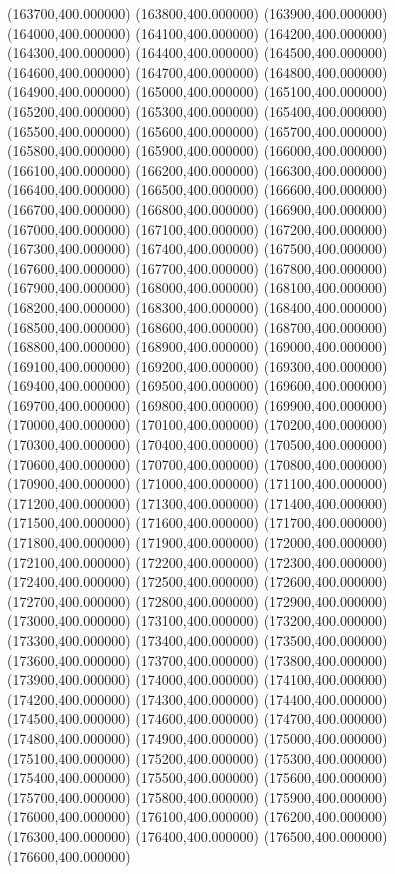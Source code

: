 (163700,400.000000)
(163800,400.000000)
(163900,400.000000)
(164000,400.000000)
(164100,400.000000)
(164200,400.000000)
(164300,400.000000)
(164400,400.000000)
(164500,400.000000)
(164600,400.000000)
(164700,400.000000)
(164800,400.000000)
(164900,400.000000)
(165000,400.000000)
(165100,400.000000)
(165200,400.000000)
(165300,400.000000)
(165400,400.000000)
(165500,400.000000)
(165600,400.000000)
(165700,400.000000)
(165800,400.000000)
(165900,400.000000)
(166000,400.000000)
(166100,400.000000)
(166200,400.000000)
(166300,400.000000)
(166400,400.000000)
(166500,400.000000)
(166600,400.000000)
(166700,400.000000)
(166800,400.000000)
(166900,400.000000)
(167000,400.000000)
(167100,400.000000)
(167200,400.000000)
(167300,400.000000)
(167400,400.000000)
(167500,400.000000)
(167600,400.000000)
(167700,400.000000)
(167800,400.000000)
(167900,400.000000)
(168000,400.000000)
(168100,400.000000)
(168200,400.000000)
(168300,400.000000)
(168400,400.000000)
(168500,400.000000)
(168600,400.000000)
(168700,400.000000)
(168800,400.000000)
(168900,400.000000)
(169000,400.000000)
(169100,400.000000)
(169200,400.000000)
(169300,400.000000)
(169400,400.000000)
(169500,400.000000)
(169600,400.000000)
(169700,400.000000)
(169800,400.000000)
(169900,400.000000)
(170000,400.000000)
(170100,400.000000)
(170200,400.000000)
(170300,400.000000)
(170400,400.000000)
(170500,400.000000)
(170600,400.000000)
(170700,400.000000)
(170800,400.000000)
(170900,400.000000)
(171000,400.000000)
(171100,400.000000)
(171200,400.000000)
(171300,400.000000)
(171400,400.000000)
(171500,400.000000)
(171600,400.000000)
(171700,400.000000)
(171800,400.000000)
(171900,400.000000)
(172000,400.000000)
(172100,400.000000)
(172200,400.000000)
(172300,400.000000)
(172400,400.000000)
(172500,400.000000)
(172600,400.000000)
(172700,400.000000)
(172800,400.000000)
(172900,400.000000)
(173000,400.000000)
(173100,400.000000)
(173200,400.000000)
(173300,400.000000)
(173400,400.000000)
(173500,400.000000)
(173600,400.000000)
(173700,400.000000)
(173800,400.000000)
(173900,400.000000)
(174000,400.000000)
(174100,400.000000)
(174200,400.000000)
(174300,400.000000)
(174400,400.000000)
(174500,400.000000)
(174600,400.000000)
(174700,400.000000)
(174800,400.000000)
(174900,400.000000)
(175000,400.000000)
(175100,400.000000)
(175200,400.000000)
(175300,400.000000)
(175400,400.000000)
(175500,400.000000)
(175600,400.000000)
(175700,400.000000)
(175800,400.000000)
(175900,400.000000)
(176000,400.000000)
(176100,400.000000)
(176200,400.000000)
(176300,400.000000)
(176400,400.000000)
(176500,400.000000)
(176600,400.000000)

